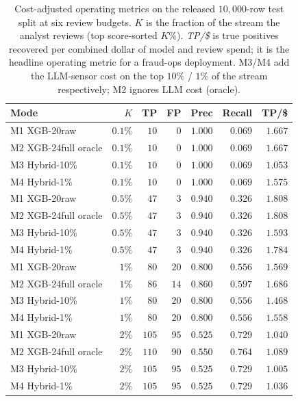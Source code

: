 \begin{table}[t]
\centering
\small
\caption{Cost-adjusted operating metrics on the released $10{,}000$-row
test split at six review budgets. $K$ is the fraction of the stream
the analyst reviews (top score-sorted $K\%$). \emph{TP/\$} is true
positives recovered per combined dollar of model and review spend; it
is the headline operating metric for a fraud-ops deployment. M3/M4
add the LLM-sensor cost on the top $10\%$ / $1\%$ of the stream
respectively; M2 ignores LLM cost (oracle).}
\label{tab:p8-evidence-cost-curve}
\begin{tabular}{lrrrrrr}
\toprule
Mode & $K$ & TP & FP & Prec & Recall & TP/\$ \\
\midrule
M1 XGB-20raw           & $0.1\%$ & $10$  & $0$   & $1.000$ & $0.069$ & $1.667$ \\
M2 XGB-24full oracle   & $0.1\%$ & $10$  & $0$   & $1.000$ & $0.069$ & $1.667$ \\
M3 Hybrid-10\%         & $0.1\%$ & $10$  & $0$   & $1.000$ & $0.069$ & $1.053$ \\
M4 Hybrid-1\%          & $0.1\%$ & $10$  & $0$   & $1.000$ & $0.069$ & $1.575$ \\
\midrule
M1 XGB-20raw           & $0.5\%$ & $47$  & $3$   & $0.940$ & $0.326$ & $1.808$ \\
M2 XGB-24full oracle   & $0.5\%$ & $47$  & $3$   & $0.940$ & $0.326$ & $1.808$ \\
M3 Hybrid-10\%         & $0.5\%$ & $47$  & $3$   & $0.940$ & $0.326$ & $1.593$ \\
M4 Hybrid-1\%          & $0.5\%$ & $47$  & $3$   & $0.940$ & $0.326$ & $1.784$ \\
\midrule
M1 XGB-20raw           & $1\%$   & $80$  & $20$  & $0.800$ & $0.556$ & $1.569$ \\
M2 XGB-24full oracle   & $1\%$   & $86$  & $14$  & $0.860$ & $0.597$ & $1.686$ \\
M3 Hybrid-10\%         & $1\%$   & $80$  & $20$  & $0.800$ & $0.556$ & $1.468$ \\
M4 Hybrid-1\%          & $1\%$   & $80$  & $20$  & $0.800$ & $0.556$ & $1.558$ \\
\midrule
M1 XGB-20raw           & $2\%$   & $105$ & $95$  & $0.525$ & $0.729$ & $1.040$ \\
M2 XGB-24full oracle   & $2\%$   & $110$ & $90$  & $0.550$ & $0.764$ & $1.089$ \\
M3 Hybrid-10\%         & $2\%$   & $105$ & $95$  & $0.525$ & $0.729$ & $1.005$ \\
M4 Hybrid-1\%          & $2\%$   & $105$ & $95$  & $0.525$ & $0.729$ & $1.036$ \\

\end{tabular}
\end{table}
